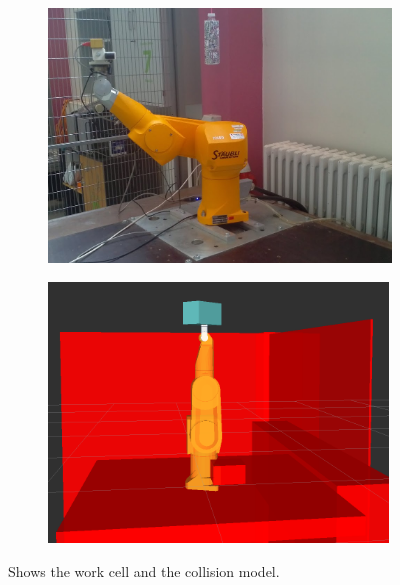 \begin{figure}[htb]
	\centering
        \begin{subfigure}[b]{0.4\textwidth}
        		\begin{center}
				\includegraphics[width=\textwidth]{graphics/05_robotics/workcell.png}
			\end{center}
        \end{subfigure}
        \begin{subfigure}[b]{0.4\textwidth}
        \begin{center}
			\includegraphics[width=0.99\textwidth]{graphics/08_resultsdiscussion/robot_collision_scene.png}
			\end{center}
        \end{subfigure} 
		\caption{Shows the work cell and the collision model.}\label{fig:workcell}
\end{figure}

